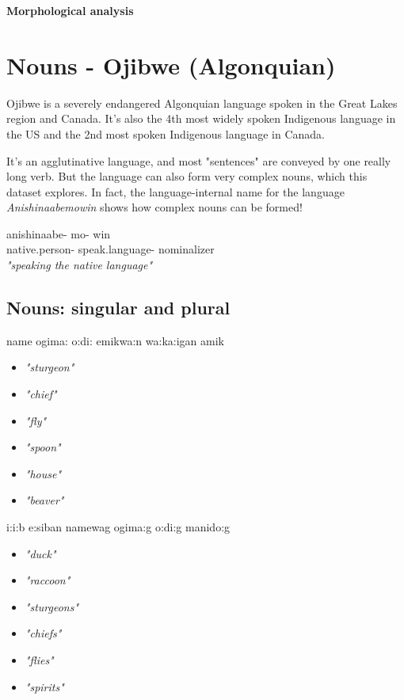 \documentclass[a4paper,11pt]{article}
\begin{document}
\begin{center}
\Large{\textbf{Morphological analysis}}
\end{center}


\section{Nouns - Ojibwe (Algonquian)}

Ojibwe is a severely endangered Algonquian language spoken in the Great Lakes region and Canada. It's also the 4th most widely spoken Indigenous language in the US and the 2nd most spoken Indigenous language in Canada. 

It's an agglutinative language, and most "sentences" are conveyed by one really long verb. But the language can also form very complex nouns, which this dataset explores. In fact, the language-internal name for the language \textit{Anishinaabemowin} shows how complex nouns can be formed!

\begin{exe}
\ex \gll anishinaabe- mo- win \\
	native.person- speak.language- nominalizer \\
\glt \textit{"speaking the native language"}
\end{exe}




\subsection{Nouns: singular and plural}


\begin{multicols}{4}
\begin{exe}
\ex name 
\ex ogima: 
\ex o:d{\textyogh}i: 
\ex emikwa:n
\ex wa:ka:{\textglotstop}igan 
\ex amik
\end{exe}
\columnbreak
\begin{itemize}
\item[] \textit{"sturgeon"}
\item[] \textit{"chief"}
\item[] \textit{"fly"}
\item[] \textit{"spoon"}
\item[] \textit{"house"}
\item[] \textit{"beaver"}
\end{itemize}
\columnbreak
\begin{exe}
\ex {\textyogh}i:i:b
\ex e:siban 
\ex namewag
\ex ogima:g 
\ex o:d{\textyogh}i:g 
\ex manido:g 
\end{exe}
\columnbreak
\begin{itemize}
\item[] \textit{"duck"}
\item[] \textit{"raccoon"}
\item[] \textit{"sturgeons"}
\item[] \textit{"chiefs"}
\item[] \textit{"flies"}
\item[] \textit{"spirits"}
\end{itemize}
\end{multicols}
\end{document}
